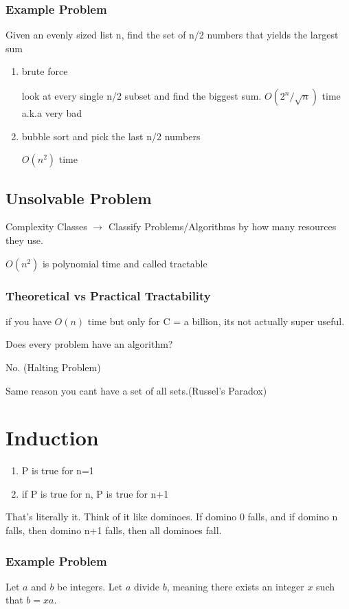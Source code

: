 \documentclass{report}
\begin{document}
\subsection{Example Problem}
Given an evenly sized list n, find the set of n/2 numbers that yields the largest sum
\begin{enumerate}
\item
brute force

look at every single n/2 subset and find the biggest sum.
\(
O(2^n/\sqrt{n}) \) time a.k.a very bad

\item
bubble sort and pick the last n/2 numbers

$ O(n^2) $ time
\end{enumerate}


\section{Unsolvable Problem}
Complexity Classes \( \longrightarrow \) Classify Problems/Algorithms
by how many resources they use.

\( O(n^2) \) is polynomial time and called tractable

\subsection{Theoretical vs Practical Tractability}
if you have \( O(n) \) time but only for C = a billion, its not actually super useful.

Does every problem have an algorithm?

No. (Halting Problem)

Same reason you cant have a set of all sets.(Russel's Paradox)



\chapter{Induction}
\begin{enumerate}
\item
P is true for n=1
\item
if P is true for n, P is true for n+1
\end{enumerate}

That's literally it. Think of it like dominoes. If domino 0 falls, and if domino n falls, then domino n+1 falls, then all dominoes fall.

\subsection{Example Problem}
Let $a$ and $b$ be integers. Let $a$ divide $b$, meaning there exists an integer $x$ such that $b = xa$.
\end{document}
